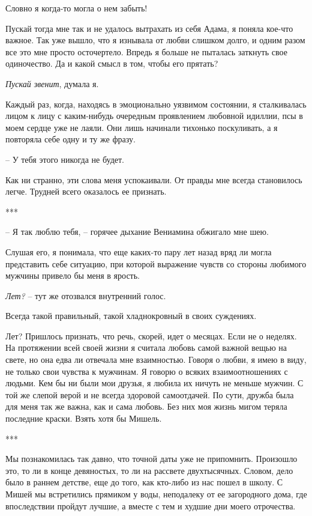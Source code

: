 \documentclass[
]{book}
\begin{document}
Словно я когда-то могла о нем забыть!

Пускай тогда мне так и не удалось вытрахать из себя Адама, я поняла кое-что важное. Так уже вышло, что я изнывала от любви слишком долго, и одним разом все это мне просто осточертело. Впредь я больше не пыталась заткнуть свое одиночество. Да и какой смысл в том, чтобы его прятать?

\emph{Пускай звенит}, думала я.

Каждый раз, когда, находясь в эмоционально уязвимом состоянии, я сталкивалась лицом к лицу с каким-нибудь очередным проявлением любовной идиллии, псы в моем сердце уже не лаяли. Они лишь начинали тихонько поскуливать, а я повторяла себе одну и ту же фразу.

-- У тебя этого никогда не будет.

Как ни странно, эти слова меня успокаивали. От правды мне всегда становилось легче. Трудней всего оказалось ее признать.

***

-- Я так люблю тебя, -- горячее дыхание Вениамина обжигало мне шею.

Слушая его, я понимала, что еще каких-то пару лет назад вряд ли могла представить себе ситуацию, при которой выражение чувств со стороны любимого мужчины привело бы меня в ярость.

\emph{Лет?} -- тут же отозвался внутренний голос.

Всегда такой правильный, такой хладнокровный в своих суждениях.

Лет? Пришлось признать, что речь, скорей, идет о месяцах. Если не о неделях. На протяжении всей своей жизни я считала любовь самой важной вещью на свете, но она едва ли отвечала мне взаимностью. Говоря о любви, я имею в виду, не только свои чувства к мужчинам. Я говорю о всяких взаимоотношениях с людьми. Кем бы ни были мои друзья, я любила их ничуть не меньше мужчин. С той же слепой верой и не всегда здоровой самоотдачей. По сути, дружба была для меня так же важна, как и сама любовь. Без них моя жизнь мигом теряла последние краски. Взять хотя бы Мишель.

***

Мы познакомилась так давно, что точной даты уже не припомнить. Произошло это, то ли в конце девяностых, то ли на рассвете двухтысячных. Словом, дело было в раннем детстве, еще до того, как кто-либо из нас пошел в школу. С Мишей мы встретились прямиком у воды, неподалеку от ее загородного дома, где впоследствии пройдут лучшие, а вместе с тем и худшие дни моего отрочества.
\end{document}
